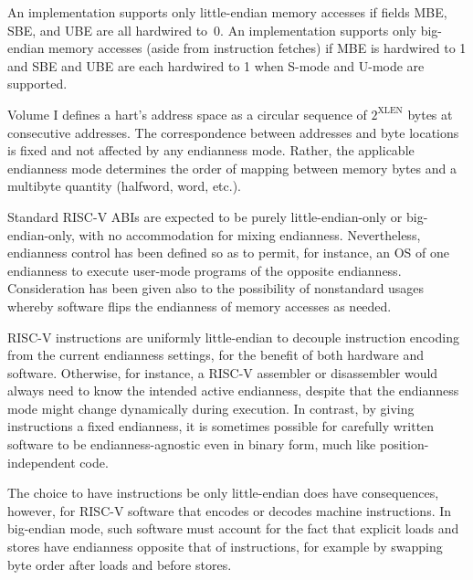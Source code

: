 \begin{commentary}
An implementation supports only little-endian memory accesses if fields
MBE, SBE, and UBE are all hardwired to~0.
An implementation supports only big-endian memory accesses (aside from
instruction fetches) if MBE is hardwired to 1 and SBE and UBE are each
hardwired to 1 when S-mode and U-mode are supported.
\end{commentary}

\begin{commentary}
Volume I defines a hart's address space as a circular sequence of
$2^{\text{XLEN}}$ bytes at consecutive addresses.
The correspondence between addresses and byte locations is fixed and not
affected by any endianness mode.
Rather, the applicable endianness mode determines the order of mapping
between memory bytes and a multibyte quantity (halfword, word, etc.).
\end{commentary}

\begin{commentary}
Standard RISC-V ABIs are expected to be purely little-endian-only or
big-endian-only, with no accommodation for mixing endianness.
Nevertheless, endianness control has been defined so as to permit, for
instance, an OS of one endianness to execute user-mode programs of the
opposite endianness.
Consideration has been given also to the possibility of nonstandard
usages whereby software flips the endianness of memory accesses as
needed.
\end{commentary}

\begin{commentary}
RISC-V instructions are uniformly little-endian to decouple instruction
encoding from the current endianness settings, for the benefit of both
hardware and software.
Otherwise, for instance, a RISC-V assembler or disassembler would always
need to know the intended active endianness, despite that the endianness
mode might change dynamically during execution.
In contrast, by giving instructions a fixed endianness, it is sometimes
possible for carefully written software to be endianness-agnostic even in
binary form, much like position-independent code.

The choice to have instructions be only little-endian does have
consequences, however, for RISC-V software that encodes or decodes
machine instructions.
In big-endian mode, such software must account for the fact that explicit
loads and stores have endianness opposite that of instructions, for
example by swapping byte order after loads and before stores.
\end{commentary}

